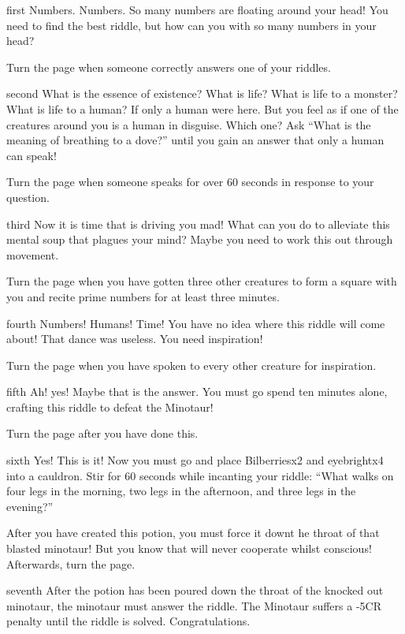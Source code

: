 \documentclass[notebook]{guildcamp2} %
\begin{document}
\startnotebook{\nriddletastic{}}

\begin{page}{first}
Numbers. Numbers. So many numbers are floating around your head! You need to find the best riddle, but how can you with so many numbers in your head? 

Turn the page when someone correctly answers one of your riddles.
\end{page}

\begin{page}{second}
What is the essence of existence? What is life? What is life to a monster? What is life to a human? If only a human were here. But you feel as if one of the creatures around you is a human in disguise. Which one? Ask ``What is the meaning of breathing to a dove?'' until you gain an answer that only a human can speak!

Turn the page when someone speaks for over 60 seconds in response to your question.
\end{page}
\begin{page}{third}
Now it is time that is driving you mad! What can you do to alleviate this mental soup that plagues your mind? Maybe you need to work this out through movement. 

Turn the page when you have gotten three other creatures to form a square with you and recite prime numbers for at least three minutes. 

\end{page}
\begin{page}{fourth}
Numbers! Humans! Time! You have no idea where this riddle will come about! That dance was useless. You need inspiration! 

Turn the page when you have spoken to every other creature for inspiration.
\end{page}
\begin{page}{fifth}
Ah! yes! Maybe that is the answer. You must go spend ten minutes alone, crafting this riddle to defeat the Minotaur!

Turn the page after you have done this.
\end{page}
\begin{page}{sixth}
Yes! This is it! Now you must go and place Bilberriesx2 and eyebrightx4 into a cauldron. Stir for 60 seconds while incanting your riddle: ``What walks on four legs in the morning, two legs in the afternoon, and three legs in the evening?''

After you have created this potion, you must force it downt he throat of that blasted minotaur! But you know that \cMinotaur{} will never cooperate whilst conscious! Afterwards, turn the page.
\end{page}

\begin{page}{seventh}
After the potion has been poured down the throat of the knocked out minotaur, the minotaur must answer the riddle. The Minotaur suffers a -5CR penalty until the riddle is solved. 
Congratulations.
\end{page}


\endnotebook
\end{document}
